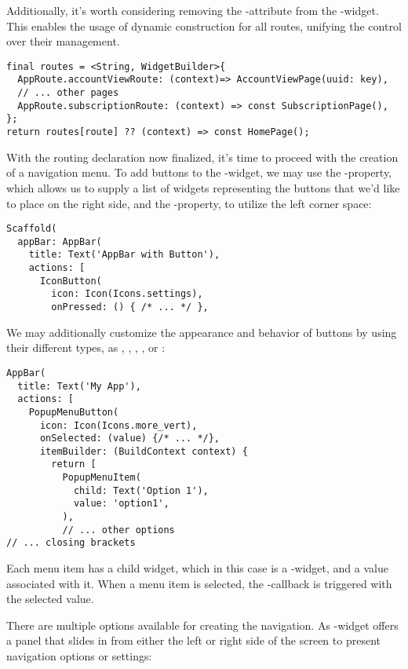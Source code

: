 \noindent Additionally, it's worth considering removing the -attribute from the -widget. This 
enables the usage of dynamic construction for all routes, unifying the control over their management.

\begin{lstlisting}
final routes = <String, WidgetBuilder>{
  AppRoute.accountViewRoute: (context)=> AccountViewPage(uuid: key),
  // ... other pages
  AppRoute.subscriptionRoute: (context) => const SubscriptionPage(),
};
return routes[route] ?? (context) => const HomePage();
\end{lstlisting}

\noindent With the routing declaration now finalized, it's time to proceed with the creation of a navigation menu. To 
add buttons to the -widget, we may use the -property, which allows us to supply a list of 
widgets representing the buttons that we'd like to place on the right side, and the -property, to utilize 
the left corner space:

\begin{lstlisting}
Scaffold(
  appBar: AppBar(
    title: Text('AppBar with Button'),
    actions: [
      IconButton(
        icon: Icon(Icons.settings),
        onPressed: () { /* ... */ }, 
\end{lstlisting}

\noindent We may additionally customize the appearance and behavior of buttons by using their different types, as 
, , , , or :

\begin{lstlisting}
AppBar(
  title: Text('My App'),
  actions: [
    PopupMenuButton(
      icon: Icon(Icons.more_vert),
      onSelected: (value) {/* ... */},
      itemBuilder: (BuildContext context) {
        return [
          PopupMenuItem(
            child: Text('Option 1'),
            value: 'option1',
          ),
          // ... other options
// ... closing brackets
\end{lstlisting}

\noindent Each menu item has a child widget, which in this case is a -widget, and a value associated with it. 
When a menu item is selected, the -callback is triggered with the selected value.

There are multiple options available for creating the navigation. As -widget offers a panel that slides in 
from either the left or right side of the screen to present navigation options or settings:

